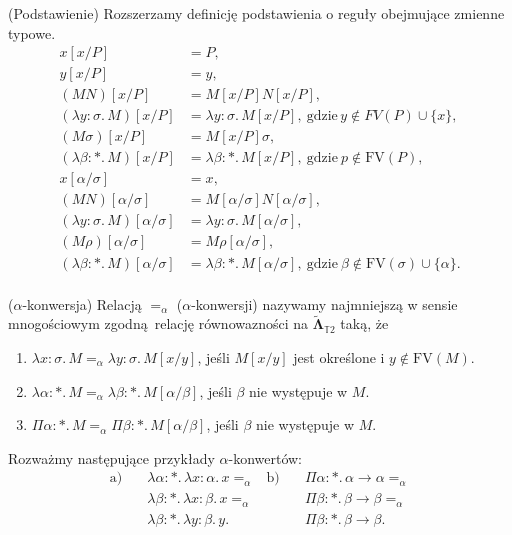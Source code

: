   \begin{definicja}(Podstawienie) Rozszerzamy definicję podstawienia o reguły obejmujące zmienne typowe.
  \begin{align*}
    x[x/P] &= P,\\
    y[x/P] &= y,\\
    (MN)[x/P] &= M[x/P]N[x/P],\\
    (\lambda y:\sigma.\,M)[x/P] &= \lambda y:\sigma.\,M[x/P],\ \text{gdzie}\, y\not\in FV(P)\cup\{x\},\\
    (M\sigma)[x/P] &= M[x/P]\sigma,\\
    (\lambda \beta:*.\,M)[x/P] &= \lambda \beta:*.\,M[x/P],\ \text{gdzie}\ p\not\in\mathrm{FV}(P),\\
    x[\alpha/\sigma]&=x,\\
    (MN)[\alpha/\sigma] &= M[\alpha/\sigma]N[\alpha/\sigma],\\
    (\lambda y:\sigma.\,M)[\alpha/\sigma] &= \lambda y:\sigma.\,M[\alpha/\sigma],\\
    (M\rho)[\alpha/\sigma] &= M\rho[\alpha/\sigma],\\
    (\lambda \beta:*.\,M)[\alpha/\sigma] &= \lambda \beta:*.\,M[\alpha/\sigma],\ \text{gdzie}\ \beta\not\in\mathrm{FV}(\sigma)\cup\{\alpha\}.\\
  \end{align*}
  \end{definicja}

  \begin{definicja}(\(\alpha\)-konwersja) 
    Relacją \(=_{\alpha}\) (\(\alpha\)-konwersji) nazywamy najmniejszą w sensie mnogościowym zgodną relację równowazności na \(\mathbf{\tilde\Lambda}_{\mathbb{T}2}\) taką, że
    \begin{enumerate}[label=(\(\alpha\)\arabic*), ref=(\(\alpha\)\arabic*)]
      \setlength\itemsep{0em}
      \item \(\lambda x:\sigma.\,M =_\alpha \lambda y:\sigma.\,M[x/y]\), jeśli \(M[x/y]\) jest określone i \(y\not\in \mathrm{FV}(M)\).
      \item \(\lambda \alpha:*.\,M =_\alpha \lambda \beta:*.\,M[\alpha/\beta]\), jeśli \(\beta\) nie występuje w \(M\).
      \item \(\Pi \alpha:*.\,M =_\alpha \Pi \beta:*.\,M[\alpha/\beta]\), jeśli \(\beta\) nie występuje w \(M\).
    \end{enumerate}
  \end{definicja}

\begin{przyklad} Rozważmy następujące przykłady \(\alpha\)-konwertów:
  \begin{align*}
    \text{a)}\quad &\lambda \alpha:*.\,\lambda x:\alpha.\,x=_\alpha 
              & \text{b)} \quad& \Pi \alpha:*.\,\alpha\to\alpha =_\alpha\\
    &\lambda \beta:*.\,\lambda x:\beta.\, x=_\alpha 
              & &\Pi\beta:*.\,\beta\to\beta  =_\alpha\\ 
    &\lambda \beta:*.\,\lambda y:\beta.\, y. 
              & &\Pi\beta:*.\,\beta\to\beta.
  \end{align*}
\end{przyklad}

